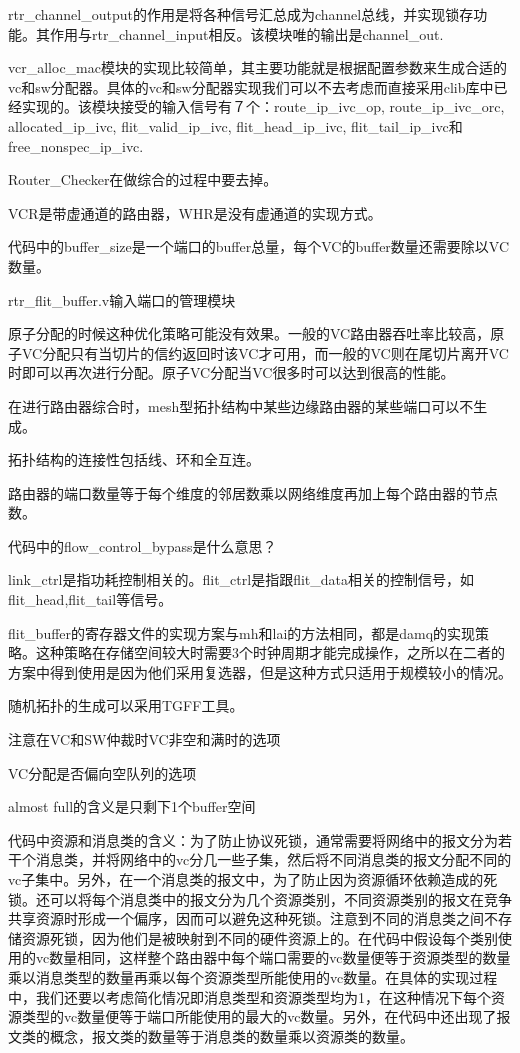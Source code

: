 ﻿\documentclass[10pt,journal]{IEEEtran}
\begin{document}
rtr\_channel\_output的作用是将各种信号汇总成为channel总线，并实现锁存功能。其作用与rtr\_channel\_input相反。该模块唯的输出是channel\_out.

vcr\_alloc\_mac模块的实现比较简单，其主要功能就是根据配置参数来生成合适的vc和sw分配器。具体的vc和sw分配器实现我们可以不去考虑而直接采用clib库中已经实现的。该模块接受的输入信号有７个：route\_ip\_ivc\_op, route\_ip\_ivc\_orc, allocated\_ip\_ivc, flit\_valid\_ip\_ivc, flit\_head\_ip\_ivc, flit\_tail\_ip\_ivc和free\_nonspec\_ip\_ivc.

Router\_Checker在做综合的过程中要去掉。

VCR是带虚通道的路由器，WHR是没有虚通道的实现方式。

代码中的buffer\_size是一个端口的buffer总量，每个VC的buffer数量还需要除以VC数量。

rtr\_flit\_buffer.v输入端口的管理模块

原子分配的时候这种优化策略可能没有效果。一般的VC路由器吞吐率比较高，原子VC分配只有当切片的信约返回时该VC才可用，而一般的VC则在尾切片离开VC时即可以再次进行分配。原子VC分配当VC很多时可以达到很高的性能。

在进行路由器综合时，mesh型拓扑结构中某些边缘路由器的某些端口可以不生成。

拓扑结构的连接性包括线、环和全互连。

路由器的端口数量等于每个维度的邻居数乘以网络维度再加上每个路由器的节点数。

代码中的flow\_control\_bypass是什么意思？

link\_ctrl是指功耗控制相关的。flit\_ctrl是指跟flit\_data相关的控制信号，如flit\_head,flit\_tail等信号。

flit\_buffer的寄存器文件的实现方案与mh和lai的方法相同，都是damq的实现策略。这种策略在存储空间较大时需要3个时钟周期才能完成操作，之所以在二者的方案中得到使用是因为他们采用复选器，但是这种方式只适用于规模较小的情况。

随机拓扑的生成可以采用TGFF工具。

注意在VC和SW仲裁时VC非空和满时的选项

VC分配是否偏向空队列的选项

almost full的含义是只剩下1个buffer空间

代码中资源和消息类的含义：为了防止协议死锁，通常需要将网络中的报文分为若干个消息类，并将网络中的vc分几一些子集，然后将不同消息类的报文分配不同的vc子集中。另外，在一个消息类的报文中，为了防止因为资源循环依赖造成的死锁。还可以将每个消息类中的报文分为几个资源类别，不同资源类别的报文在竞争共享资源时形成一个偏序，因而可以避免这种死锁。注意到不同的消息类之间不存储资源死锁，因为他们是被映射到不同的硬件资源上的。在代码中假设每个类别使用的vc数量相同，这样整个路由器中每个端口需要的vc数量便等于资源类型的数量乘以消息类型的数量再乘以每个资源类型所能使用的vc数量。在具体的实现过程中，我们还要以考虑简化情况即消息类型和资源类型均为1，在这种情况下每个资源类型的vc数量便等于端口所能使用的最大的vc数量。另外，在代码中还出现了报文类的概念，报文类的数量等于消息类的数量乘以资源类的数量。
\end{document}
